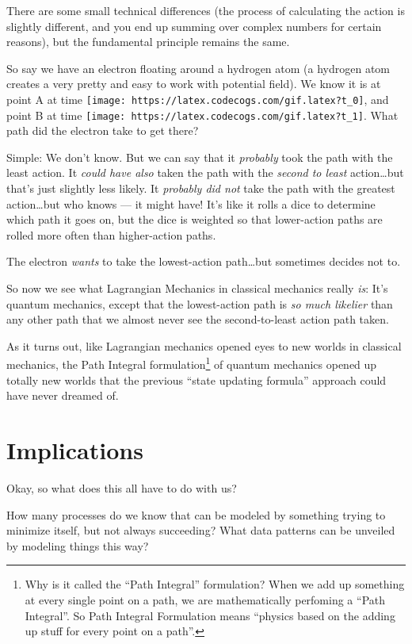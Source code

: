 \documentclass[]{article}
\begin{document}
There are some small technical differences (the process of calculating the
action is slightly different, and you end up summing over complex numbers for
certain reasons), but the fundamental principle remains the same.

So say we have an electron floating around a hydrogen atom (a hydrogen atom
creates a very pretty and easy to work with potential field). We know it is at
point A at time \texttt{[image: https://latex.codecogs.com/gif.latex?t\_0]}, and
point B at time \texttt{[image: https://latex.codecogs.com/gif.latex?t\_1]}. What
path did the electron take to get there?

Simple: We don't know. But we can say that it \emph{probably} took the path with
the least action. It \emph{could have also} taken the path with the \emph{second
to least} action\ldots{}but that's just slightly less likely. It \emph{probably
did not} take the path with the greatest action\ldots{}but who knows --- it
might have! It's like it rolls a dice to determine which path it goes on, but
the dice is weighted so that lower-action paths are rolled more often than
higher-action paths.

The electron \emph{wants} to take the lowest-action path\ldots{}but sometimes
decides not to.

So now we see what Lagrangian Mechanics in classical mechanics really \emph{is}:
It's quantum mechanics, except that the lowest-action path is \emph{so much
likelier} than any other path that we almost never see the second-to-least
action path taken.

As it turns out, like Lagrangian mechanics opened eyes to new worlds in
classical mechanics, the Path Integral formulation\footnote{Why is it called the
  ``Path Integral'' formulation? When we add up something at every single point
  on a path, we are mathematically perfoming a ``Path Integral''. So Path
  Integral Formulation means ``physics based on the adding up stuff for every
  point on a path''.} of quantum mechanics opened up totally new worlds that the
previous ``state updating formula'' approach could have never dreamed of.

\section{Implications}\label{implications}

Okay, so what does this all have to do with us?

How many processes do we know that can be modeled by something trying to
minimize itself, but not always succeeding? What data patterns can be unveiled
by modeling things this way?
\end{document}
